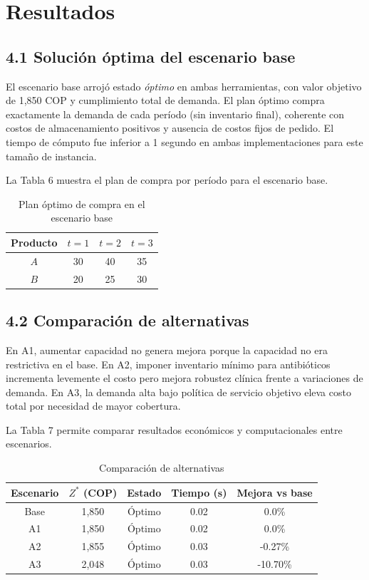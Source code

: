 \documentclass[12pt,letterpaper]{article}
\begin{document}
\section{Resultados}
\subsection{4.1 Solución óptima del escenario base}
El escenario base arrojó estado \textit{óptimo} en ambas herramientas, con valor objetivo de 1,850 COP y cumplimiento total de demanda. El plan óptimo compra exactamente la demanda de cada período (sin inventario final), coherente con costos de almacenamiento positivos y ausencia de costos fijos de pedido. El tiempo de cómputo fue inferior a 1 segundo en ambas implementaciones para este tamaño de instancia.

La Tabla 6 muestra el plan de compra por período para el escenario base.
\begin{table}[H]
\centering
\caption{Plan óptimo de compra en el escenario base}
\begin{tabular}{|c|c|c|c|}
\hline
\textbf{Producto} & \textbf{$t=1$} & \textbf{$t=2$} & \textbf{$t=3$} \\
\hline
$A$ & 30 & 40 & 35 \\
\hline
$B$ & 20 & 25 & 30 \\
\hline
\end{tabular}
\end{table}

\subsection{4.2 Comparación de alternativas}
En A1, aumentar capacidad no genera mejora porque la capacidad no era restrictiva en el base. En A2, imponer inventario mínimo para antibióticos incrementa levemente el costo pero mejora robustez clínica frente a variaciones de demanda. En A3, la demanda alta bajo política de servicio objetivo eleva costo total por necesidad de mayor cobertura.

La Tabla 7 permite comparar resultados económicos y computacionales entre escenarios.
\begin{table}[H]
\centering
\caption{Comparación de alternativas}
\begin{tabular}{|c|c|c|c|c|}
\hline
\textbf{Escenario} & \textbf{$Z^*$ (COP)} & \textbf{Estado} & \textbf{Tiempo (s)} & \textbf{Mejora vs base} \\
\hline
Base & 1,850 & Óptimo & 0.02 & 0.0\% \\
\hline
A1 & 1,850 & Óptimo & 0.02 & 0.0\% \\
\hline
A2 & 1,855 & Óptimo & 0.03 & -0.27\% \\
\hline
A3 & 2,048 & Óptimo & 0.03 & -10.70\% \\
\hline
\end{tabular}
\end{table}
\end{document}

